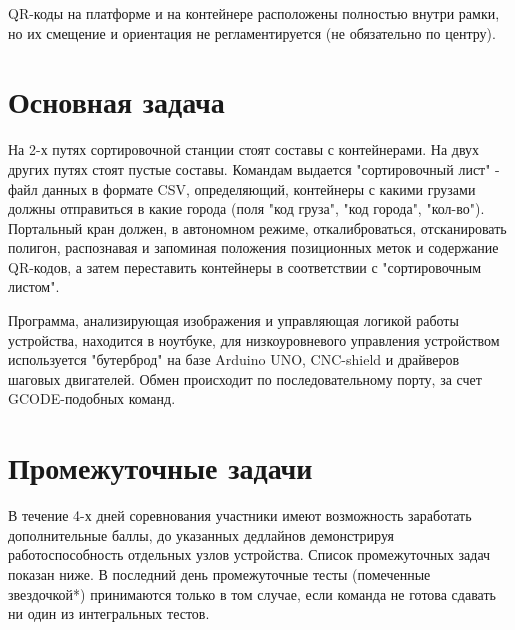 QR-коды на платформе и на контейнере расположены полностью внутри рамки, но их смещение и ориентация не регламентируется (не обязательно по центру).

\section{Основная задача}

На 2-х путях сортировочной станции стоят составы с контейнерами.  На двух других путях стоят пустые составы. Командам выдается "сортировочный лист" - файл данных в формате CSV, определяющий, контейнеры с какими грузами должны отправиться в какие города (поля "код груза", "код города", "кол-во").   Портальный кран должен, в автономном режиме, откалиброваться, отсканировать полигон, распознавая и запоминая положения позиционных меток и содержание QR-кодов, а затем переставить контейнеры в соответствии с "сортировочным листом".  

Программа, анализирующая изображения и управляющая логикой работы устройства, находится в ноутбуке,  для низкоуровневого управления устройством используется "бутерброд" на базе  Arduino UNO, CNC-shield и драйверов шаговых двигателей.  Обмен происходит по последовательному порту, за счет GCODE-подобных команд.

\section{Промежуточные задачи} 


В течение 4-х дней соревнования участники имеют возможность заработать дополнительные баллы, до указанных дедлайнов демонстрируя работоспособность отдельных узлов устройства. Список промежуточных задач показан ниже.  В последний день промежуточные тесты (помеченные звездочкой*) принимаются только в том случае, если команда не готова сдавать ни один из интегральных тестов.

